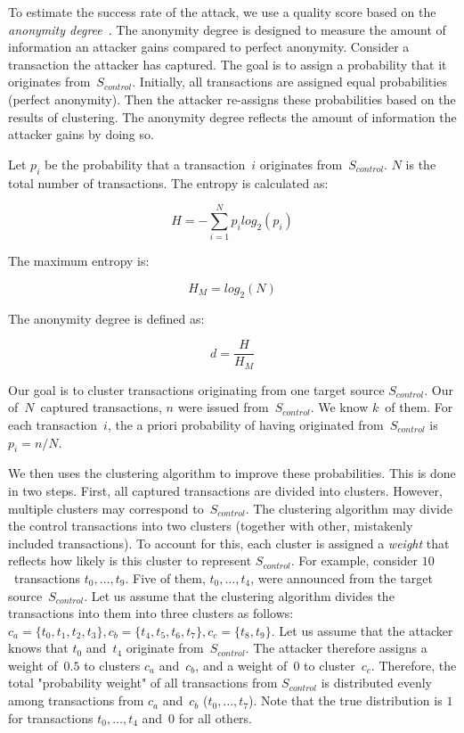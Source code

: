 To estimate the success rate of the attack, we use a quality score based on the \textit{anonymity degree}~\cite{Diaz2002}.
The anonymity degree is designed to measure the amount of information an attacker gains compared to perfect anonymity.
Consider a transaction the attacker has captured.
The goal is to assign a probability that it originates from~$S_{control}$.
Initially, all transactions are assigned equal probabilities (perfect anonymity).
Then the attacker re-assigns these probabilities based on the results of clustering.
The anonymity degree reflects the amount of information the attacker gains by doing so.

Let $p_i$ be the probability that a transaction~$i$ originates from~$S_{control}$.
$N$ is the total number of transactions.
The entropy is calculated as:

\[
H = -\sum_{i=1}^N p_i log_2(p_i)
\]

The maximum entropy is:

\[
H_M = log_2(N)
\]

The anonymity degree is defined as:

\[
d = \frac{H}{H_M}
\]


Our goal is to cluster transactions originating from one target source $S_{control}$.
Our of~$N$~captured transactions, $n$ were issued from~$S_{control}$.
We know $k$~of them.
For each transaction~$i$, the a priori probability of having originated from~$S_{control}$ is $p_i = n / N$.

We then uses the clustering algorithm to improve these probabilities.
This is done in two steps.
First, all captured transactions are divided into clusters.
However, multiple clusters may correspond to~$S_{control}$.
The clustering algorithm may divide the control transactions into two clusters (together with other, mistakenly included transactions).
To account for this, each cluster is assigned a \textit{weight} that reflects how likely is this cluster to represent $S_{control}$.
For example, consider $10$~transactions $t_0, \dots, t_9$.
Five of them, $t_0, \dots, t_4$, were announced from the target source~$S_{control}$.
Let us assume that the clustering algorithm divides the transactions into them into three clusters as follows: $c_a = \{t_0, t_1, t_2, t_3\}, c_b = \{t_4, t_5, t_6, t_7\}, c_c = \{t_8, t_9\}$.
Let us assume that the attacker knows that $t_0$ and~$t_4$ originate from~$S_{control}$.
The attacker therefore assigns a weight of~$0.5$ to clusters $c_a$ and~$c_b$, and a weight of~$0$ to cluster~$c_c$.
Therefore, the total "probability weight" of all transactions from $S_{control}$ is distributed evenly among transactions from $c_a$ and~$c_b$ ($t_0, \dots, t_7$).
Note that the true distribution is $1$ for transactions $t_0, \dots, t_4$ and~$0$ for all others.

